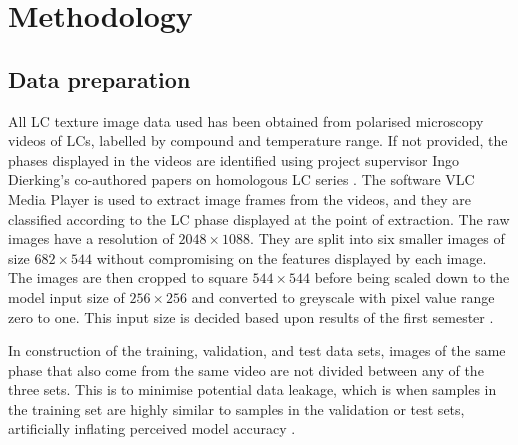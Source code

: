 \documentclass[12pt]{article}
\begin{document}
\section{Methodology}

\subsection{Data preparation}
All LC texture image data used has been obtained from polarised microscopy videos of LCs, labelled by compound and temperature range. If not provided, the phases displayed in the videos are identified using project supervisor Ingo Dierking's co-authored papers on homologous LC series \cite{Dierking94, Schacht95}. The software VLC Media Player \cite{VideoLan06} is used to extract image frames from the videos, and they are classified  according to the LC phase displayed at the point of extraction. The raw images have a resolution of $2048\times1088$. They are split into six smaller images of size $682\times544$ without compromising on the features displayed by each image. The images are then cropped to square $544\times544$ before being scaled down to the model input size of $256\times256$ and converted to greyscale with pixel value range zero to one. This input size is decided based upon results of the first semester \cite{Heaton20}.

In construction of the training, validation, and test data sets, images of the same phase that also come from the same video are not divided between any of the three sets. This is to minimise potential data leakage, which is when samples in the training set are highly similar to samples in the validation or test sets, artificially inflating perceived model accuracy \cite{Kaufman12}.
\end{document}
